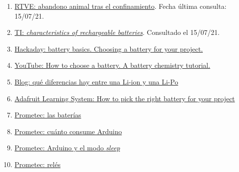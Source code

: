 \documentclass[12pt]{article}
\begin{document}
\begin{enumerate}
			\item
			\label{bib: enlace RTVE} \href{https://www.rtve.es/noticias/20200608/abandonos-animales-domesticos-se-han-disparado-espana-durante-meses-confinamiento/2015761.shtml}{RTVE: abandono animal tras el confinamiento}. Fecha última consulta: 15/07/21.
			
			\item
			\label{bib: TI rechargeable batteries}
			\href{https://www.ti.com/lit/an/snva533/snva533.pdf}{TI: \textit{characteristics of rechargeable batteries}}. Consultado el 15/07/21.
			
			\item 
			\label{bib: Hackaday battery basics}
			\href{https://hackaday.com/2014/12/16/battery-basics-choosing-a-battery-for-your-project/}{Hackaday: battery basics. Choosing a battery for your project.}

			\item 
			\label{bib: YouTube How to choose  a battery}
			\href{https://www.youtube.com/watch?v=saxYilLJ7yw}{YouTube: How to choose a battery. A battery chemistry tutorial.}
			
			\item 
			\label{bib: blog diferencias li-ion y li-po}
			\href{https://blog.330ohms.com/2020/06/22/que-diferencias-hay-entre-una-li-po-y-una-li-ion/}{Blog: qué diferencias hay entre una Li-ion y una Li-Po}
			
			\item 
			\label{bib: adafruit pick the right battery}
			\href{https://learn.adafruit.com/all-about-batteries/how-to-pick-the-right-battery-for-your-project}{Adafruit Learning System: How to pick the right battery for your project}
			
			\item 
			\label{bib: prometec baterías para proyectos con arduino}
			\href{https://www.prometec.net/arduino-baterias/}{Prometec: las baterías}
			
			\item 
			\label{bib: prometec consumo Arduino}
			\href{https://www.prometec.net/consumos-arduino/}{Prometec: cuánto consume Arduino}
			
			\item 
			\label{bib: prometec modo sleep arduino}
			\href{https://www.prometec.net/el-modo-sleep-en-arduino/}{Prometec: Arduino y el modo \textit{sleep}}
			
			\item 
			\label{bib: prometec relés}
			\href{https://www.prometec.net/reles-s4a/}{Prometec: relés}
			

\end{enumerate}
\end{document}
